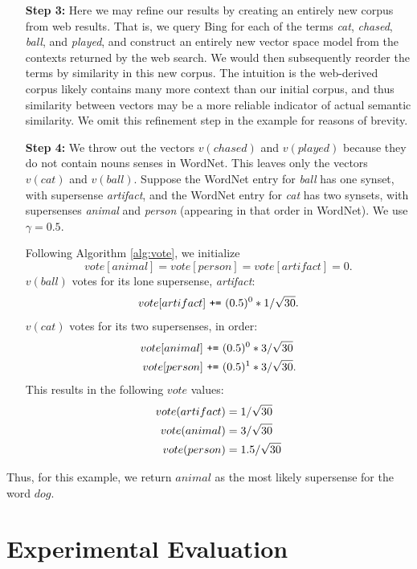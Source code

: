 \documentclass{article}
\begin{document}
\begin{enumerate}
\item[{\bf Step 3:}]
Here we may refine our results by creating an entirely new corpus from web results.
That is, we query Bing for each of the terms {\it cat}, {\it chased}, {\it ball}, and {\it played}, and construct an entirely new vector space model from the contexts returned by the web search.
We would then subsequently reorder the terms by similarity in this new corpus.
The intuition is the web-derived corpus likely contains many more context than our initial corpus, and thus similarity between vectors may be a more reliable indicator of actual semantic similarity.
We omit this refinement step in the example for reasons of brevity. 

\item[{\bf Step 4:}]
We throw out the vectors $v(chased)$ and $v(played)$ because they do not contain nouns senses in WordNet.
This leaves only the vectors $v(cat)$ and $v(ball)$.
Suppose the WordNet entry for {\it ball} has one synset, with supersense {\it artifact},
and the WordNet entry for {\it cat} has two synsets, with supersenses {\it animal} and {\it person} (appearing in that order in WordNet).
We use $\gamma = 0.5$.

Following Algorithm \ref{alg:vote}, we initialize 
$$vote[animal] = vote[person] = vote[artifact] = 0.$$
$v(ball)$ votes for its lone supersense, {\it artifact}:
$$vote[artifact]\,\, \verb!+=! \,\, (0.5)^0 * 1/\sqrt {30}.$$
$v(cat)$ votes for its two supersenses, in order:
\begin{align}
vote[animal] & \,\, \texttt{+=} \,\, (0.5)^0 * 3/ \sqrt {30} \notag\\
vote[person] & \,\, \texttt{+=} \,\, (0.5)^1 * 3/ \sqrt {30}. \notag
\end{align}
This results in the following $vote$ values:
\begin{align}
    vote(artifact) & = 1 / \sqrt{30} \notag\\
    vote(animal) & = 3 / \sqrt{30} \notag\\
    vote(person) & = 1.5 / \sqrt{30} \notag
\end{align}


\end{enumerate}

Thus, for this example, we return $animal$ as the most likely supersense for the word $dog$.


\section{Experimental Evaluation}
\end{document}
